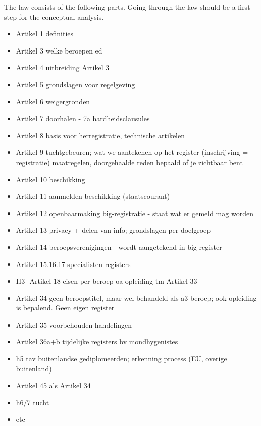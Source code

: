 {The law consists of the following parts.
Going through the law should be a first step for the conceptual analysis.}
\begin{itemize}
    \item Artikel 1 definities 
    \item Artikel 3 welke beroepen ed
    \item Artikel 4 uitbreiding Artikel 3
    \item Artikel 5 grondslagen voor regelgeving
    \item Artikel 6 weigergronden
    \item Artikel 7 doorhalen - 7a hardheidsclausules
    \item Artikel 8 basis voor herregistratie, technische artikelen
    \item Artikel 9 tuchtgebeuren; wat we aantekenen op het register (inschrijving = registratie) maatregelen, doorgehaalde reden bepaald of je zichtbaar bent 
    \item Artikel 10 beschikking
    \item Artikel 11 aanmelden beschikking (staatscourant)
    \item Artikel 12 openbaarmaking big-registratie - staat wat er gemeld mag worden
    \item Artikel 13 privacy + delen van info; grondslagen per doelgroep
    \item Artikel 14 beroepsverenigingen - wordt aangetekend in big-register
    \item Artikel 15.16.17 specialisten registers
    \item H3- Artikel 18 eisen per beroep oa opleiding tm Artikel 33
    \item Artikel 34 geen beroepstitel, maar wel behandeld als a3-beroep; ook opleiding is bepalend. Geen eigen register
    \item Artikel 35 voorbehouden handelingen
    \item Artikel 36a+b tijdelijke registers bv mondhygenistes
    \item h5 tav buitenlandse gediplomeerden; erkenning process (EU, overige buitenland)
    \item Artikel 45 als Artikel 34
    \item h6/7 tucht
    \item etc
\end{itemize}

